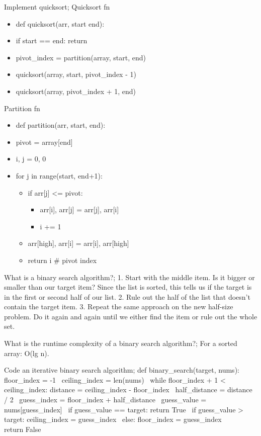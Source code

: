\documentclass{article}
\begin{document}
Implement quicksort; Quicksort fn \begin{itemize} \item def quicksort(arr, start end): \item if start == end: return \item pivot\_index = partition(array, start, end) \item quicksort(array, start, pivot\_index - 1) \item quicksort(array, pivot\_index + 1, end) \end{itemize} Partition fn \begin{itemize} \item def partition(arr, start, end): \item pivot = array[end] \item i, j = 0, 0 \item for j in range(start, end+1): \begin{itemize} \item if arr[j] <= pivot: \begin{itemize} \item arr[i], arr[j] = arr[j], arr[i] \item i += 1 \end{itemize} \item arr[high], arr[i] = arr[i], arr[high] \item return i # pivot index \end{itemize} \end{itemize}

What is a binary search algorithm?; 1. Start with the middle item. Is it bigger or smaller than our target item? Since the list is sorted, this tells us if the target is in the first or second half of our list. 2. Rule out the half of the list that doesn’t contain the target item. 3. Repeat the same approach on the new half-size problem. Do it again and again until we either find the item or rule out the whole set.

What is the runtime complexity of a binary search algorithm?; For a sorted array: O(lg n).

Code an iterative binary search algorithm; def binary_search(target, nums): floor_index = -1 \ ceiling_index = len(nums) \ while floor_index + 1 < ceiling_index: distance = ceiling_index - floor_index \ half_distance = distance / 2 \ guess_index = floor_index + half_distance \ guess_value = nums[guess_index] \ if guess_value == target: return True \ if guess_value > target: ceiling_index = guess_index \ else: floor_index = guess_index \\ return False
\end{document}
